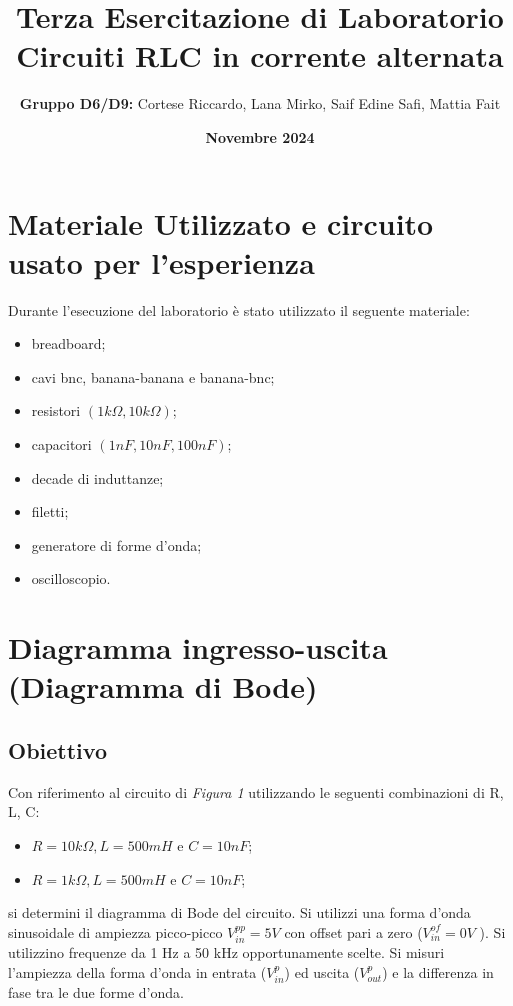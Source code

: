 \documentclass[a4paper,10pt]{article}
\title{\Large\textbf{Terza Esercitazione di Laboratorio}\\ \vspace{0.5em} \large Circuiti RLC in corrente alternata}
\author{\textbf{Gruppo D6/D9:} Cortese Riccardo, Lana Mirko, Saif Edine Safi, Mattia Fait}
\date{\textbf{Novembre 2024}}
\begin{document}
\maketitle
\tableofcontents %
\newpage

\section*{Materiale Utilizzato e circuito usato per l'esperienza}

Durante l'esecuzione del laboratorio è stato utilizzato il seguente materiale:
\begin{itemize}
    \item breadboard;
    \item cavi bnc, banana-banana e banana-bnc;
    \item resistori \((1k\Omega, 10k\Omega)\);
    \item capacitori \((1nF, 10nF, 100nF)\);
    \item decade di induttanze;
    \item filetti;
    \item generatore di forme d'onda;
    \item oscilloscopio.
\end{itemize}



\section{Diagramma ingresso-uscita (Diagramma di Bode)}

\subsection{Obiettivo}
Con riferimento al circuito di \textit{Figura 1} utilizzando le seguenti combinazioni di R, L, C:
\begin{itemize}
    \item $R = 10 k\Omega, L = 500 mH$ e $C = 10 nF$;
    \item $R = 1 k\Omega, L = 500 mH$ e $C = 10 nF$;
\end{itemize}

si determini il diagramma di Bode del circuito. Si utilizzi una forma d'onda sinusoidale di ampiezza picco-picco $V_{in}^{pp} = 5 V$ con offset pari a zero ($V_{in}^{of} = 0 V$ ). Si utilizzino frequenze da 1 Hz a 50 kHz opportunamente scelte. Si misuri l'ampiezza della forma d'onda in entrata ($V_{in}^{p}$) ed uscita ($V_{out}^{p}$) e la differenza in fase tra le due forme d'onda. 
\end{document}
